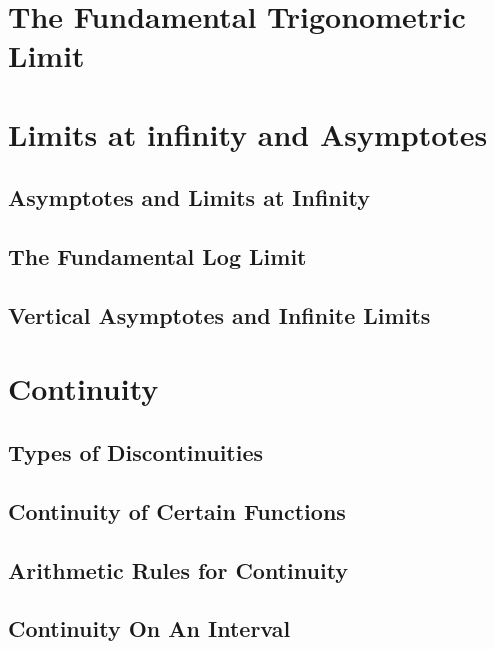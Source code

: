 \section{The Fundamental Trigonometric Limit}
\section{Limits at infinity and Asymptotes}
\subsection{Asymptotes and Limits at Infinity}
\subsection{The Fundamental Log Limit}
\subsection{Vertical Asymptotes and Infinite Limits}
\section{Continuity}
\subsection{Types of Discontinuities}
\subsection{Continuity of Certain Functions}
\subsection{Arithmetic Rules for Continuity}
\subsection{Continuity On An Interval}